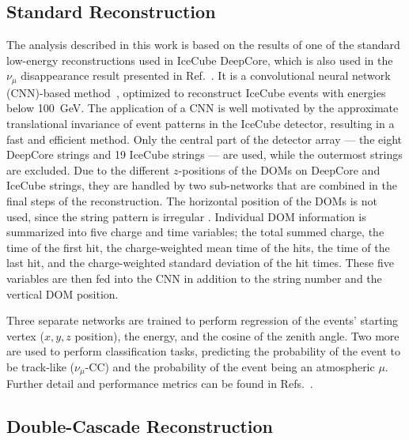 \documentclass[
    aps,
    prd,
    reprint,
    amsmath,
    amssymb,
    nofootinbib,
    superscriptaddress,
    floatfix
]{revtex4-2}
\newcommand{\gev}{\giga\electronvolt}
\providecommand{\DIFaddtex}[1]{{\protect\color{blue}\uwave{#1}}} %
\providecommand{\DIFaddbegin}{} %
\providecommand{\DIFaddend}{} %
\providecommand{\DIFadd}[1]{\texorpdfstring{\DIFaddtex{#1}}{#1}} %
\newcommand{\DIFaddincludegraphics}[2][]{{\color{blue}\fbox{\DIFOincludegraphics[#1]{#2}}}} %
\DeclareRobustCommand{\DIFaddbegin}{\DIFOaddbegin \let\includegraphics\DIFaddincludegraphics} %
\DeclareRobustCommand{\DIFaddend}{\DIFOaddend \let\includegraphics\DIFOincludegraphics} %
\begin{document}
\subsection{\label{sec:flercnn} Standard Reconstruction}

The analysis described in this work is based on the results of one of the standard low-energy reconstructions used in IceCube DeepCore, which is also used in the $\nu_{\mu}$ disappearance result presented in Ref.~\cite{IceCube:2024xjj}.
It is a convolutional neural network (CNN)-based method~\cite{Micallef:2022jvd, flercnn_proceedings, flercnn}, optimized to reconstruct IceCube events with energies below \SI{100}{\gev}.
The application of a CNN is well motivated by the approximate translational invariance of event patterns in the IceCube detector, resulting in a fast and efficient method.
Only the central part of the detector array --- the eight DeepCore strings and 19 IceCube strings --- are used, while the outermost strings are excluded.
Due to the different $z$-positions of the DOMs on DeepCore and IceCube strings, they are handled by two sub-networks that are combined in the final steps of the reconstruction.
The horizontal position of the DOMs is not used, since the string pattern is irregular \DIFaddbegin \DIFadd{- a limitation of the CNN architecture used}\DIFaddend .
Individual DOM information is summarized into five charge and time variables; the total summed charge, the time of the first hit, the charge-weighted mean time of the hits, the time of the last hit, and the charge-weighted standard deviation of the hit times. These five variables are then fed into the CNN in addition to the string number and the vertical DOM position.

Three separate networks are trained to perform regression of the events' starting vertex ($x,y,z$ position), the energy, and the cosine of the zenith angle.
Two more are used to perform classification tasks, predicting the probability of the event to be track-like ($\nu_\mu$-CC) and the probability of the event being an atmospheric $\mu$. Further detail and performance metrics can be found in Refs.~\cite{Micallef:2022jvd, flercnn_proceedings}.


\subsection{\label{sec:taupede} Double-Cascade Reconstruction}
\end{document}
